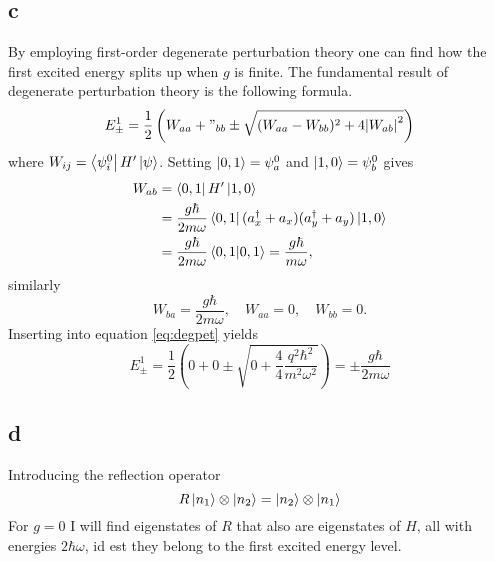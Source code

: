 \documentclass[11pt]{amsart}
\begin{document}
\subsection*{c}
By employing first-order degenerate perturbation theory one can find how the first excited energy splits up when $g$ is finite. The fundamental result of degenerate perturbation theory is the following formula.
\begin{equation}
\label{eq:degpet}
E_\pm^1=\frac{1}{2}\left(W_{aa} + "_{bb} \pm \sqrt{(W_{aa}-W_{bb})^2 + 4\abs{W_{ab}}^2} \right)
\end{equation}
where $W_{ij} = \bra{\psi_i^0}H'\ket{\psi}$. Setting $\ket{0,1}=\psi_a^0$ and $\ket{1,0}=\psi_b^0$ gives
\begin{align*}
W_{ab} 	&= \bra{0,1}H'\ket{1,0} \\
		&= \frac{g\hbar}{2m\omega}\bra{0,1}(a_x^{\dagger}+a_x)(a_y^{\dagger}+a_y)\ket{1,0} \\
		&= \frac{g\hbar}{2m\omega}\braket{0,1} = \frac{g\hbar}{m\omega}, 
\end{align*}
similarly
\begin{equation*}
W_{ba} = \frac{g\hbar}{2m\omega}, \quad W_{aa} = 0, \quad W_{bb} = 0.
\end{equation*}
Inserting into equation \ref{eq:degpet} yields
\begin{equation*}
E_\pm^1=\frac{1}{2}\left(0 + 0 \pm \sqrt{0 + \frac{4}{4}\frac{q^2\hbar^2}{m^2\omega^2}}\right) = \pm \frac{g\hbar}{2m\omega}
\end{equation*}

\subsection*{d}
Introducing the reflection operator
\begin{equation}
\label{eq:reflectionoperator}
R\ket{n_1}\otimes\ket{n_2}=\ket{n_2}\otimes\ket{n_1}
\end{equation}
For $g=0$ I will find eigenstates of $R$ that also are eigenstates of $H$, all with energies $2\hbar\omega$, 
id est they belong to the first excited energy level.
\end{document}

